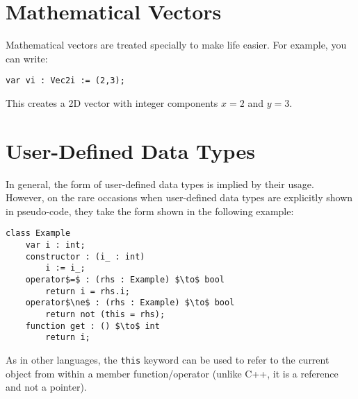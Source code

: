 \section{Mathematical Vectors}

Mathematical vectors are treated specially to make life easier. For example, you can write:
%
\begin{lstlisting}[style=Snippet]
var vi : Vec2i := (2,3);
\end{lstlisting}
%
This creates a 2D vector with integer components $x = 2$ and $y = 3$.

\section{User-Defined Data Types}

In general, the form of user-defined data types is implied by their usage. However, on the rare occasions when user-defined data types are explicitly shown in pseudo-code, they take the form shown in the following example:
%
\begin{lstlisting}[style=Snippet]
class Example
	var i : int;
	constructor : (i_ : int)
		i := i_;
	operator$=$ : (rhs : Example) $\to$ bool
		return i = rhs.i;
	operator$\ne$ : (rhs : Example) $\to$ bool
		return not (this = rhs);
	function get : () $\to$ int
		return i;
\end{lstlisting}
%
As in other languages, the \texttt{this} keyword can be used to refer to the current object from within a member function/operator (unlike C++, it is a reference and not a pointer).

